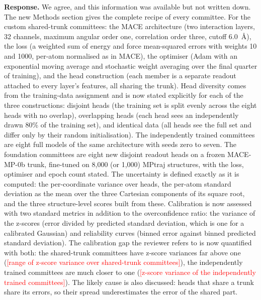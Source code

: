 \documentclass[11pt]{article}
\providecommand{\fsTODO}[1]{\textcolor{red}{[#1]}}
\newcommand{\response}{\medskip\noindent\textbf{Response.} }
\begin{document}
\response
We agree, and this information was available but not written down. The new
Methods section gives the complete recipe of every committee. For the custom
shared-trunk committees: the MACE architecture (two interaction layers, 32
channels, maximum angular order one, correlation order three, cutoff
6.0~\AA), the loss (a weighted sum of energy and force mean-squared errors
with weights 10 and 1000, per-atom normalised as in MACE), the optimiser
(Adam with an exponential moving average and stochastic weight averaging over
the final quarter of training), and the head construction (each member is a
separate readout attached to every layer's features, all sharing the trunk).
Head diversity comes from the training-data assignment and is now stated
explicitly for each of the three constructions: disjoint heads (the training
set is split evenly across the eight heads with no overlap), overlapping
heads (each head sees an independently drawn 80\% of the training set), and
identical data (all heads see the full set and differ only by their random
initialisation). The independently trained committees are eight full models
of the same architecture with seeds zero to seven. The foundation committees
are eight new disjoint readout heads on a frozen MACE-MP-0b trunk, fine-tuned
on 8,000 (or 1,000) MPtraj structures, with the loss, optimiser and epoch
count stated. The uncertainty is defined exactly as it is computed: the
per-coordinate variance over heads, the per-atom standard deviation as the
mean over the three Cartesian components of its square root, and the three
structure-level scores built from these. Calibration is now assessed with two
standard metrics in addition to the overconfidence ratio: the variance of the
z-scores (error divided by predicted standard deviation, which is one for a
calibrated Gaussian) and reliability curves (binned error against binned
predicted standard deviation). The calibration gap the reviewer refers to is
now quantified with both: the shared-trunk committees have z-score variances
far above one (\fsTODO{range of z-score variance over shared-trunk
committees}), the independently trained committees are much closer to one
(\fsTODO{z-score variance of the independently trained committees}). The
likely cause is also discussed: heads that share a trunk share its errors, so
their spread underestimates the error of the shared part.
\end{document}
